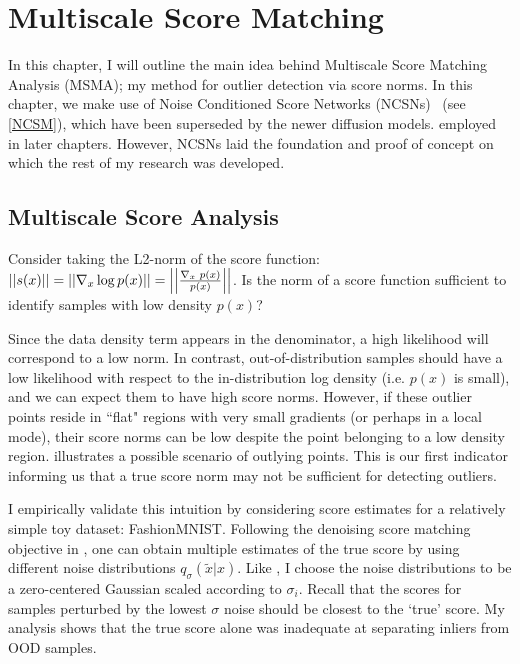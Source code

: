 \chapter{Multiscale Score Matching}
\label{ch:msma}

In this chapter, I will outline the main idea behind Multiscale Score Matching Analysis (MSMA); my method for outlier detection via score norms. In this chapter, we make use of Noise Conditioned Score Networks (NCSNs)~\cite{Song2019} (see \ref{NCSM}), which have been superseded by the newer diffusion models. employed in later chapters. However, NCSNs laid the foundation and proof of concept on which the rest of my research was developed.

\section{Multiscale Score Analysis}
\label{multiscale}

Consider taking the L2-norm of the score function:
$ \left|\left| { s(x) } \right|\right| = \left|\left| { \nabla_{x} \log p(x)  } \right|\right| = \left|\left| { \frac{\nabla_{x}\text{~}p(x)}{p(x)} } \right|\right| $. Is the norm of a score function sufficient to identify samples with low density $p(x)$?

Since the data density term appears in the denominator, a high likelihood will correspond to a low norm. In contrast, out-of-distribution samples should have a low likelihood with respect to the in-distribution log density (i.e. $p(x)$ is small), and we can expect them to have high score norms. However, if these outlier points reside in ``flat" regions with very small gradients (or perhaps in a local mode),  their score norms can be low despite the point belonging to a low density region. 
 illustrates a possible scenario of outlying points.
This is our first indicator informing us that a true score norm may not be sufficient for detecting outliers. 

I empirically validate this intuition by considering score estimates for a relatively simple toy dataset: FashionMNIST. Following the denoising score matching objective in , one can obtain multiple estimates of the true score by using different noise distributions $q_{\sigma}(\tilde{x}|x)$. Like \cite{Song2019}, I choose the noise distributions to be a zero-centered Gaussian scaled according to $\sigma_i$. Recall that the scores for samples perturbed by the lowest $\sigma$ noise should be closest to the `true' score. My analysis shows that the true score alone was inadequate at separating inliers from OOD samples.

